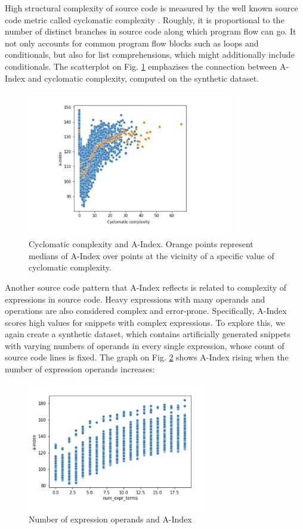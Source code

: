\documentclass[10pt,conference]{IEEEtran}
\begin{document}
High structural complexity of source code is measured by the well known source code metric called cyclomatic complexity \cite{CCWiki}.
Roughly, it is proportional to the number of distinct branches in source code along which program flow
can go. It not only accounts for common program flow blocks such as loops and conditionals, but also for
list comprehensions, which might additionally include conditionals. The scatterplot on Fig. 
\ref{a_index_vs_cyclomatic_complexity} emphazises
the connection between {\sc A-Index} and cyclomatic complexity, computed on the synthetic dataset.
\begin{figure}
\begin{center}
\includegraphics[width=9cm]{a_index_vs_cyclomatic_complexity.pdf}
\caption{Cyclomatic complexity and {\sc A-Index}. Orange points represent medians of {\sc A-Index} over points at the vicinity of a specific value of cyclomatic complexity.}\label{a_index_vs_cyclomatic_complexity}
\end{center}
\end{figure}

Another source code pattern that {\sc A-Index} reflects is related to complexity of expressions in source code.
Heavy expressions with many operands and operations are also considered complex and error-prone.
Specifically, {\sc A-Index} scores high values for snippets with complex expressions. 
To explore this, we again create a synthetic dataset, which contains artificially generated snippets 
with varying numbers of operands in every single expression, whose count of source code lines is fixed.
The graph on Fig. \ref{number_of_terms_in_expressions_vs_a_index} shows {\sc A-Index} rising when the number of expression operands increases:
\begin{figure}
\begin{center}
\includegraphics[width=8cm]{number_of_terms_in_expressions_vs_a_index.pdf}
\caption{Number of expression operands and {\sc A-Index}}\label{number_of_terms_in_expressions_vs_a_index}
\end{center}
\end{figure}
\end{document}
